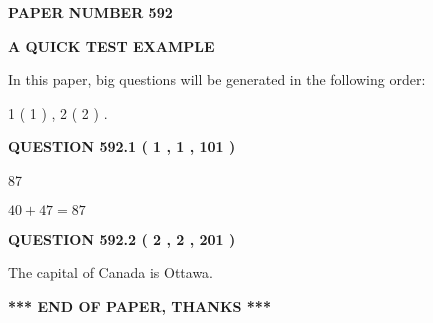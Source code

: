 \documentclass[12pt]{article}
\begin{document}
   
\newpage 
\setcounter{page}{ 
   592001 } 
   
   
   
   
 {\textbf{ \Large{ PAPER NUMBER  592  }}}
   
   
\vspace{0.2in}
   
   
   
   
   
   
 \vspace{0.2in}
{\LARGE {\textbf{ A QUICK TEST EXAMPLE}}}
   
   
   
\vspace{0.2in}
   
In this paper, big questions will be generated in the following order: 
   
   
   1 ( 1 )
 ,
   2 ( 2 )
 .
  
\vspace{0.2in}
  
{\textbf{\Large{QUESTION
592.1 
 ( 1 , 1 , 101 )
}}}
  
  
 
 
\noindent{}

87
 
 
 
 
\noindent{}

$ %
40 +  %
47=   %
87$
 
 
  
\vspace{0.2in}
  
{\textbf{\Large{QUESTION
592.2 
 ( 2 , 2 , 201 )
}}}
  
  
 
 
\noindent{}
 
 
The capital of Canada is Ottawa.
 
 
 
 
   
   
 \vspace{0.2in}
 
   
   
   
   
\vspace{1.0in} 
{\textbf{\large{ *** END OF PAPER, THANKS *** }}} 
   
\end{document}
